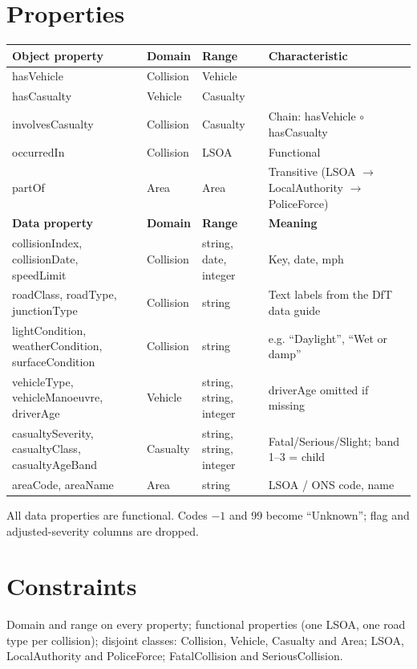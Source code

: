 \documentclass[10.5pt,a4paper]{article}
\begin{document}
\section{Properties}
\small
\begin{longtable}{L{3.4cm} L{2.6cm} L{2.6cm} L{7.2cm}}
\toprule \textbf{Object property} & \textbf{Domain} & \textbf{Range} & \textbf{Characteristic}\\\midrule
hasVehicle & Collision & Vehicle &\\
hasCasualty & Vehicle & Casualty &\\
involvesCasualty & Collision & Casualty & Chain: hasVehicle $\circ$ hasCasualty\\
occurredIn & Collision & LSOA & Functional\\
partOf & Area & Area & Transitive (LSOA $\to$ LocalAuthority $\to$ PoliceForce)\\\midrule
\textbf{Data property} & \textbf{Domain} & \textbf{Range} & \textbf{Meaning}\\\midrule
collisionIndex, collisionDate, speedLimit & Collision & string, date, integer & Key, date, mph\\
roadClass, roadType, junctionType & Collision & string & Text labels from the DfT data guide\\
lightCondition, weatherCondition, surfaceCondition & Collision & string & e.g. ``Daylight'', ``Wet or damp''\\
vehicleType, vehicleManoeuvre, driverAge & Vehicle & string, string, integer & driverAge omitted if missing\\
casualtySeverity, casualtyClass, casualtyAgeBand & Casualty & string, string, integer & Fatal/Serious/Slight; band 1--3 = child\\
areaCode, areaName & Area & string & LSOA / ONS code, name\\
\bottomrule\end{longtable}
\normalsize
All data properties are functional. Codes $-1$ and 99 become ``Unknown''; flag and adjusted-severity columns are dropped.

\section{Constraints}
Domain and range on every property; functional properties (one LSOA, one road type per collision); disjoint classes: Collision, Vehicle, Casualty and Area; LSOA, LocalAuthority and PoliceForce; FatalCollision and SeriousCollision.
\end{document}
